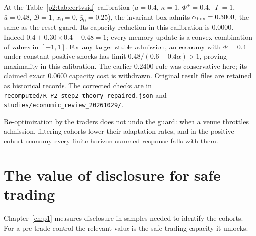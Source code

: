 At the Table~\ref{p2:tab:certvsid} calibration ($a=0.4$, $\kappa=1$, $\Phi^+=0.4$, $|I|=1$, $\bar u=0.48$, $\mathcal B=1$, $x_0=0$, $\bar y_0=0.25$), the invariant box admits $\alpha_{\rm box}=0.3000$, the same as the reset guard. Its capacity reduction in this calibration is $0.0000$. Indeed $0.4+0.30\times0.4+0.48=1$; every memory update is a convex combination of values in $[-1,1]$. For any larger stable admission, an economy with $\Phi=0.4$ under constant positive shocks has limit $0.48/(0.6-0.4\alpha)>1$, proving maximality in this calibration. The earlier $0.2400$ rule was conservative here; its claimed exact $0.0600$ capacity cost is withdrawn. Original result files are retained as historical records. The corrected checks are in \texttt{recomputed/R\_P2\_step2\_theory\_repaired.json} and \texttt{studies/economic\_review\_20261029/}.

    Re-optimization by the traders does not undo the guard: when a venue throttles admission, filtering cohorts lower their adaptation rates, and in the positive cohort economy every finite-horizon summed response falls with them.

    \section{The value of disclosure for safe trading}\label{p2:sec:disclosure}

    Chapter~\ref{ch:p1} measures disclosure in samples needed to identify the cohorts. For a pre-trade control the relevant value is the safe trading capacity it unlocks.
    
